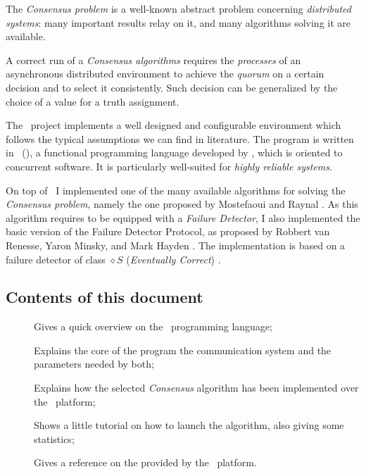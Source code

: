 The \emph{Consensus problem} is a well-known abstract problem concerning
\emph{distributed systems}: many important results relay on it, and many
algorithms solving it are available.

A correct run of a \emph{Consensus algorithms} requires the
\emph{processes} of an asynchronous distributed environment to achieve the
\emph{quorum} on a certain decision and to select it consistently. Such
decision can be generalized by the choice of a value for a truth
assignment.

The \YUNA\ project implements a well designed and configurable environment
which follows the typical assumptions we can find in literature. The
program is written in \Erlang\ (), a functional
programming language developed by , which is oriented to
concurrent software. It is particularly well-suited for \emph{highly
reliable systems}.

On top of \YUNA\ I implemented one of the many available algorithms for
solving the \emph{Consensus problem}, namely the one proposed by
Mostefaoui and Raynal \cite{bib:Cons}. As this algorithm requires to be
equipped with a \emph{Failure Detector}, I also implemented the basic
version of the Failure Detector Protocol, as proposed by Robbert van
Renesse, Yaron Minsky, and Mark Hayden \cite{bib:FD}. The implementation
is based on a failure detector of class $\diamond S$ (\emph{Eventually
Correct}) \cite{bib:QualityFD}.

\subsection{Contents of this document}

\begin{description}

    \item[] Gives a quick overview on the
        \Erlang\ programming language;

    \item[] Explains the core of the
        program the communication system and the parameters needed by
        both;

    \item[] Explains how the
        selected \emph{Consensus} algorithm has been implemented over the
        \YUNA\ platform;

    \item[] Shows a little tutorial on how to
        launch the algorithm, also giving some statistics;

    \item[] Gives a reference on the
         provided by the \YUNA\ platform.

\end{description}
